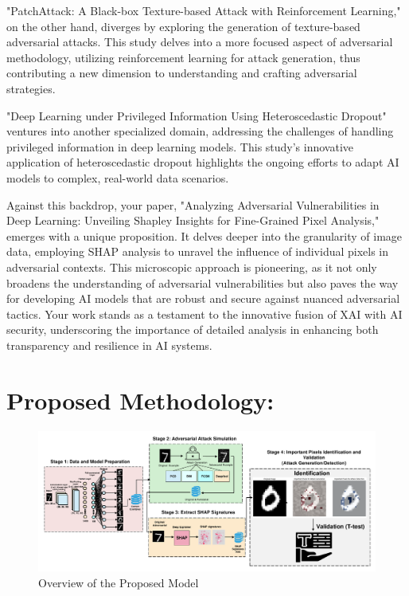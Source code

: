 \documentclass[10pt, conference, a4paper, final]{IEEEtran}
\begin{document}
"PatchAttack: A Black-box Texture-based Attack with Reinforcement Learning," on the other hand, diverges by exploring the generation of texture-based adversarial attacks. This study delves into a more focused aspect of adversarial methodology, utilizing reinforcement learning for attack generation, thus contributing a new dimension to understanding and crafting adversarial strategies.

"Deep Learning under Privileged Information Using Heteroscedastic Dropout" ventures into another specialized domain, addressing the challenges of handling privileged information in deep learning models. This study's innovative application of heteroscedastic dropout highlights the ongoing efforts to adapt AI models to complex, real-world data scenarios.

Against this backdrop, your paper, "Analyzing Adversarial Vulnerabilities in Deep Learning: Unveiling Shapley Insights for Fine-Grained Pixel Analysis," emerges with a unique proposition. It delves deeper into the granularity of image data, employing SHAP analysis to unravel the influence of individual pixels in adversarial contexts. This microscopic approach is pioneering, as it not only broadens the understanding of adversarial vulnerabilities but also paves the way for developing AI models that are robust and secure against nuanced adversarial tactics. Your work stands as a testament to the innovative fusion of XAI with AI security, underscoring the importance of detailed analysis in enhancing both transparency and resilience in AI systems.

\section{Proposed Methodology:}

\begin{figure}[!ht]
    \centering
    \includegraphics[width=1\textwidth]{paper_images/papermodel_v2.pdf}
    \caption{Overview of the Proposed Model}
    \label{overview}
\end{figure}
   
\end{document}
